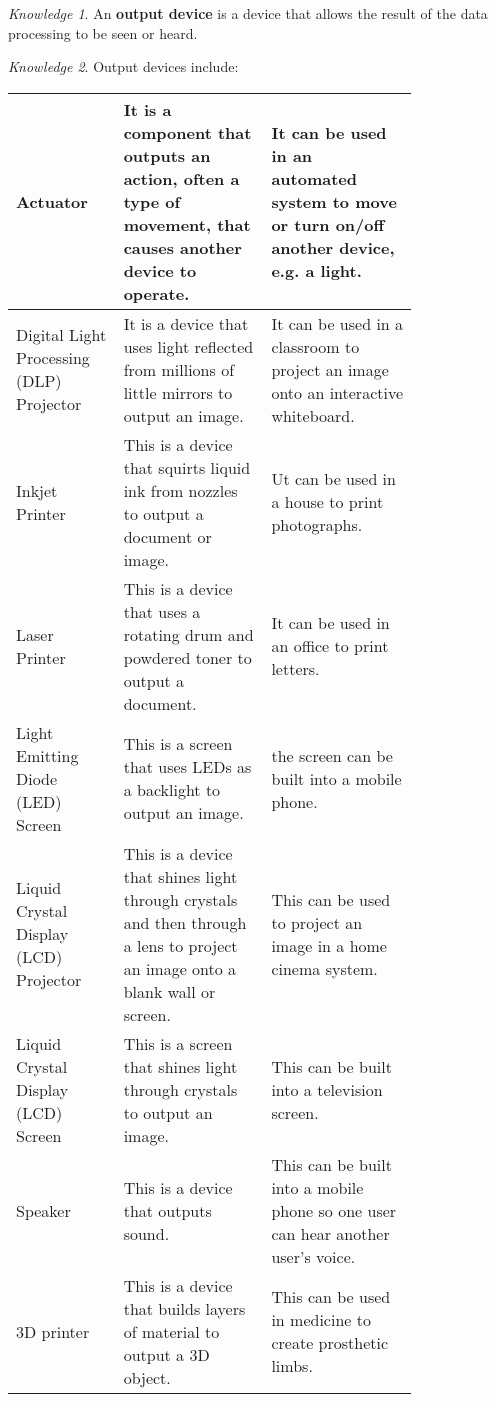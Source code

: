 \documentclass[8pt]{article}
\theoremstyle{remark}
\newtheorem{knowledge}{Knowledge}[subsection]
\begin{document}
            \begin{knowledge}
                An \textbf{output device} is a device that allows the result of the data processing to be seen or heard.
            \end{knowledge}

            \begin{knowledge}
                Output devices include:
                \begin{center}
                    \begin{tabular}{p{0.2\linewidth}|p{0.3\linewidth}|p{0.3\linewidth}}
                        Actuator & It is a component that outputs an action, often a type of movement, that causes another device to operate. & It can be used in an automated system to move or turn on/off another device, e.g. a light.\\\hline
                        Digital Light Processing (DLP) Projector & It is a device that uses light reflected from millions of little mirrors to output an image. & It can be used in a classroom to project an image onto an interactive whiteboard.\\\hline
                        Inkjet Printer & This is a device that squirts liquid ink from nozzles to output a document or image. & Ut can be used in a house to print photographs.\\\hline
                        Laser Printer & This is a device that uses a rotating drum and powdered toner to output a document. & It can be used in an office to print letters.\\\hline
                        Light Emitting Diode (LED) Screen & This is a screen that uses LEDs as a backlight to output an image. & the screen can be built into a mobile phone.\\\hline
                        Liquid Crystal Display (LCD) Projector & This is a device that shines light through crystals and then through a lens to project an image onto a blank wall or screen. & This can be used to project an image in a home cinema system.\\\hline
                        Liquid Crystal Display (LCD) Screen & This is a screen that shines light through crystals to output an image. & This can be built into a television screen.\\\hline
                        Speaker & This is a device that outputs sound. & This can be built into a mobile phone so one user can hear another user's voice.\\\hline
                        3D printer & This is a device that builds layers of material to output a 3D object. & This can be used in medicine to create prosthetic limbs.
                    \end{tabular}
                \end{center}
            \end{knowledge}
\end{document}

